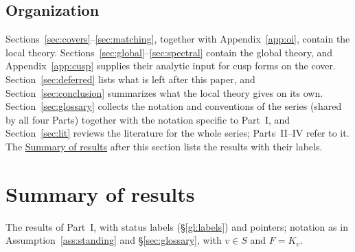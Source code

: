 \documentclass[12pt]{article}
\theoremstyle{plain}
\theoremstyle{definition}
\begin{document}
\subsection{Organization}
Sections~\ref{sec:covers}--\ref{sec:matching}, together with Appendix~\ref{app:oi}, contain the local theory. Sections~\ref{sec:global}--\ref{sec:spectral} contain the global theory, and Appendix~\ref{app:cusp} supplies their analytic input for cusp forms on the cover. Section~\ref{sec:deferred} lists what is left after this paper, and Section~\ref{sec:conclusion} summarizes what the local theory gives on its own. Section~\ref{sec:glossary} collects the notation and conventions of the series (shared by all four Parts) together with the notation specific to Part~I, and Section~\ref{sec:lit} reviews the literature for the whole series; Parts~II--IV refer to it. The \hyperref[sec:summary]{Summary of results} after this section lists the results with their labels.


\section*{Summary of results}\label{sec:summary}
The results of Part~I, with status labels (\S\ref{gl:labels}) and pointers; notation as in Assumption~\ref{ass:standing} and \S\ref{sec:glossary}, with $v\in S$ and $F=K_v$.
\end{document}
